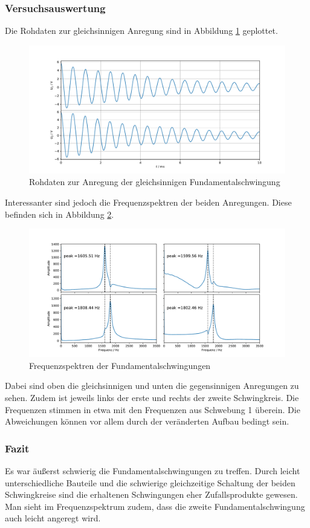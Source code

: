 \subsubsection{Versuchsauswertung}

Die Rohdaten zur gleichsinnigen Anregung sind in Abbildung \ref{abb:fundamental_roh} geplottet.  

\begin{figure}[H]
\centering
\includegraphics[width=\textwidth]{plots/fundamental_roh.pdf}
\caption{Rohdaten zur Anregung der gleichsinnigen Fundamentalschwingung}
\label{abb:fundamental_roh}
\end{figure}

Interessanter sind jedoch die Frequenzspektren der beiden Anregungen. Diese befinden sich in Abbildung \ref{abb:FFT_fundamental}.

\begin{figure}[H]
\centering
\includegraphics[width=\textwidth]{plots/fundamental_fft.pdf}
\caption{Frequenzspektren der Fundamentalschwingungen}
\label{abb:FFT_fundamental}
\end{figure}

Dabei sind oben die gleichsinnigen und unten die gegensinnigen Anregungen zu sehen. Zudem ist jeweils links der erste und rechts der zweite Schwingkreis. Die Frequenzen stimmen in etwa mit den Frequenzen aus Schwebung 1 überein. Die Abweichungen können vor allem durch der veränderten Aufbau bedingt sein.

\subsubsection{Fazit}

Es war äußerst schwierig die Fundamentalschwingungen zu treffen. Durch leicht unterschiedliche Bauteile und die schwierige gleichzeitige Schaltung der beiden Schwingkreise sind die erhaltenen Schwingungen eher Zufallsprodukte gewesen. Man sieht im Frequenzspektrum zudem, dass die zweite Fundamentalschwingung auch leicht angeregt wird.